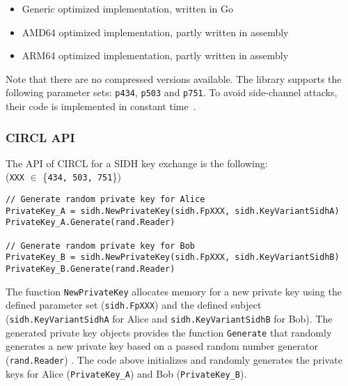 \begin{itemize}
  \item Generic optimized implementation, written in Go 
  \item AMD64 optimized implementation, partly written in assembly
  \item ARM64 optimized implementation, partly written in assembly
\end{itemize}
Note that there are no compressed versions available. The library supports the following parameter sets: \texttt{p434}, \texttt{p503} and \texttt{p751}. To avoid side-channel attacks, their code is implemented in constant time~\parencite{circl2019intro}.

\subsubsection{\gls{CIRCL} API}
The API of \gls{CIRCL} for a \gls{SIDH} key exchange is the following:\\
(\texttt{XXX} $\in$ \{\texttt{434, 503, 751}\})



\begin{lstlisting}[]
// Generate random private key for Alice
PrivateKey_A = sidh.NewPrivateKey(sidh.FpXXX, sidh.KeyVariantSidhA)
PrivateKey_A.Generate(rand.Reader)

// Generate random private key for Bob
PrivateKey_B = sidh.NewPrivateKey(sidh.FpXXX, sidh.KeyVariantSidhB)
PrivateKey_B.Generate(rand.Reader)
\end{lstlisting}
The function \texttt{NewPrivateKey} allocates memory for a new private key using the defined parameter set (\texttt{sidh.FpXXX}) and the defined subject (\texttt{sidh.KeyVariantSidhA} for Alice and \texttt{sidh.KeyVariantSidhB} for Bob). The generated private key objects provides the function \texttt{Generate} that randomly generates a new private key based on a passed random number generator (\texttt{rand.Reader}) .
The code above initializes and randomly generates the private keys for Alice (\textcolor{keywordcol}{\texttt{PrivateKey\_A}}) and Bob (\textcolor{keywordcol}{\texttt{PrivateKey\_B}}).\\

